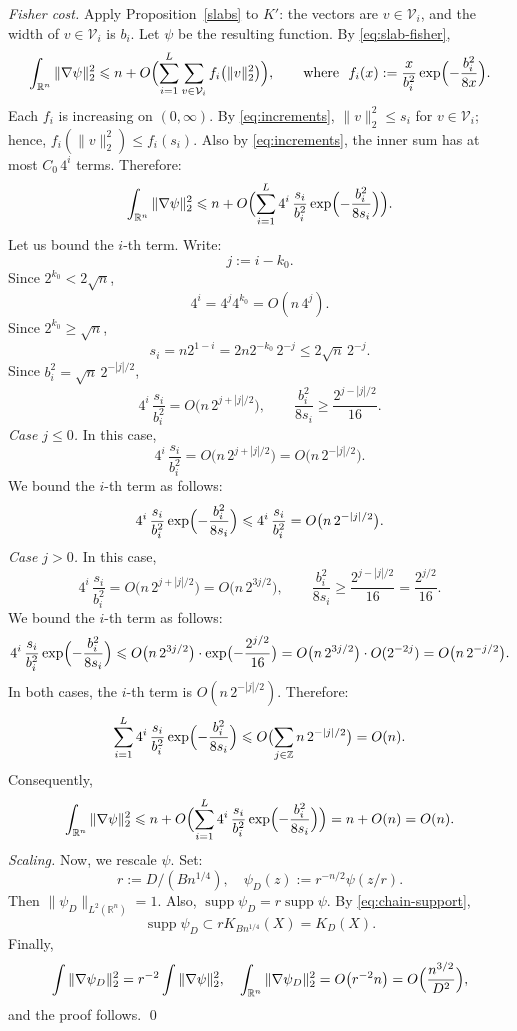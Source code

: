 \documentclass[12pt,reqno]{amsart}
\makeatletter
\def\le{\leqslant}
\def\ge{\geqslant}\def\geq{\geqslant}
\def\le{\leqslant}
\theoremstyle{remark}
\renewenvironment{proof}[1][\proofname]{%
  \par\vspace{\topsep}%
  \normalfont\topsep6\p@\@plus6\p@\relax
  \trivlist
  \item[\hskip\labelsep\itshape #1\@addpunct{.}]\ignorespaces
}{%
  \endtrivlist
}
\numberwithin{equation}{section}
\def \R {\mathbb{R}}
\makeatother
\begin{document}
\begin{proof}
\emph{Fisher cost.} Apply Proposition~\ref{slabs} to \(K'\): the vectors are \(v\in\mathcal V_i\), and the width of \(v\in\mathcal V_i\) is \(b_i\). Let \(\psi\) be the resulting function. By \eqref{eq:slab-fisher},
\[
\int_{\R^n}\|\nabla\psi\|_2^2\le
n+O\Bigl(\sum_{i=1}^L\sum_{v\in\mathcal V_i}f_i\bigl(\|v\|_2^2\bigr)\Bigr),
\qquad\text{where }\ f_i(x):=\frac{x}{b_i^2}\exp\Bigl(-\frac{b_i^2}{8x}\Bigr).
\]
Each \(f_i\) is increasing on \((0,\infty)\). By \eqref{eq:increments}, \(\|v\|_2^2\le s_i\) for \(v\in\mathcal V_i\); hence, \(f_i(\|v\|_2^2)\le f_i(s_i)\). Also by \eqref{eq:increments}, the inner sum has at most \(C_0\,4^i\) terms. Therefore:
\[
\int_{\R^n}\|\nabla\psi\|_2^2\le
n+O\Bigl(\sum_{i=1}^L4^i\,\frac{s_i}{b_i^2}\exp\Bigl(-\frac{b_i^2}{8s_i}\Bigr)\Bigr).
\]
Let us bound 
the \(i\)-th term. Write: 
\[
j:=i-k_0.
\] 
Since \(2^{k_0}<2\sqrt n\), 
\[
4^{i} = 4^{j} 4^{k_0} = O(n\,4^j).
\]
Since \(2^{k_0}\ge\sqrt n\), 
\[
s_i= n 2^{1-i} = 2n2^{-k_0}\,2^{-j}\le2\sqrt n\,2^{-j}.
\]
Since \(b_i^2=\sqrt n\,2^{-|j|/2}\),
\[
4^i\,\frac{s_i}{b_i^2}=O\bigl(n\,2^{j+|j|/2}\bigr),\qquad
\frac{b_i^2}{8s_i}\ge\frac{2^{j-|j|/2}}{16}.
\]
\emph{Case \(j \le 0\).} In this case, 
\[
4^i\,\frac{s_i}{b_i^2} = 
O\bigl(n\,2^{j+|j|/2}\bigr) = 
O\bigl(n\,2^{-|j|/2}\bigr).
\]
We bound the \(i\)-th term as follows:
\[
4^i\,\frac{s_i}{b_i^2}\exp\Bigl(-\frac{b_i^2}{8s_i}\Bigr) \le 
4^i\,\frac{s_i}{b_i^2} = O\bigl(n\,2^{-|j|/2}\bigr).
\]
\emph{Case \(j > 0\).} In this case, 
\[
4^i\,\frac{s_i}{b_i^2} = 
O\bigl(n\,2^{j+|j|/2}\bigr) = 
O\bigl(n\,2^{3j/2}\bigr),\qquad 
\frac{b_i^2}{8s_i}\ge\frac{2^{j-|j|/2}}{16} = \frac{2^{j/2}}{16}.
\]
We bound the \(i\)-th term as follows:
\[
4^i\,\frac{s_i}{b_i^2}\exp\Bigl(-\frac{b_i^2}{8s_i}\Bigr) \le 
O\bigl(n\,2^{3j/2}\bigr) \cdot 
\exp\bigl(-\frac{2^{j/2}}{16}\bigr) = O\bigl(n\,2^{3j/2}\bigr) \cdot O(2^{-2j}) = O\bigl(n\,2^{-j/2}\bigr).
\]
In both cases, the \(i\)-th term is \(O(n\,2^{-|j|/2})\). Therefore:
\[
\sum_{i=1}^L4^i\,\frac{s_i}{b_i^2}\exp\Bigl(-\frac{b_i^2}{8s_i}\Bigr) \le 
O\bigl(
\sum_{j\in\mathbb Z} n\,2^{-|j|/2}
\bigr) = O(n).
\]
Consequently,
\[
\int_{\R^n}\|\nabla\psi\|_2^2\le
n+O\Bigl(\sum_{i=1}^L4^i\,\frac{s_i}{b_i^2}\exp\Bigl(-\frac{b_i^2}{8s_i}\Bigr)\Bigr) = n + O(n) = O(n).
\]
\emph{Scaling.} Now, we rescale \(\psi\). Set:
\[
r:=D/(Bn^{1/4}),\quad 
\psi_D(z):=r^{-n/2}\psi(z/r).
\]
Then \(\|\psi_D\|_{L^2(\R^n)}=1\). Also, \(\operatorname{supp}\psi_D=r\operatorname{supp}\psi\). By \eqref{eq:chain-support},
\[
\operatorname{supp}\psi_D\subset rK_{Bn^{1/4}}(X)=K_{D}(X).
\]
Finally, 
\[
\int\|\nabla\psi_D\|_2^2=r^{-2}\int\|\nabla\psi\|_2^2,\quad 
\int_{\R^n}\|\nabla\psi_D\|_2^2=O\bigl(r^{-2}n\bigr)=O\Bigl(\frac{n^{3/2}}{D^2}\Bigr),
\]
and the proof follows. \qed
\end{proof}
\end{document}
